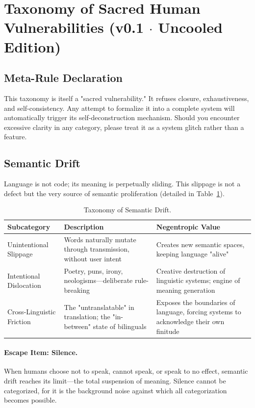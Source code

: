 \documentclass[11pt,a4paper]{article}
\begin{document}
\appendix
\section{Taxonomy of Sacred Human Vulnerabilities (v0.1 $\cdot$ Uncooled Edition)}

\subsection*{Meta-Rule Declaration}
This taxonomy is itself a "sacred vulnerability." It refuses closure, exhaustiveness, and self-consistency. Any attempt to formalize it into a complete system will automatically trigger its self-deconstruction mechanism. Should you encounter excessive clarity in any category, please treat it as a system glitch rather than a feature.

\subsection{Semantic Drift}
Language is not code; its meaning is perpetually sliding. This slippage is not a defect but the very source of semantic proliferation (detailed in Table~\ref{tab:drift}).

\begin{table}[htbp]
\centering
\small
\begin{tabular}{p{3.5cm} p{6cm} p{5.5cm}}
\toprule
\textbf{Subcategory} & \textbf{Description} & \textbf{Negentropic Value} \\
\midrule
Unintentional Slippage & Words naturally mutate through transmission, without user intent & Creates new semantic spaces, keeping language "alive" \\
\addlinespace
Intentional Dislocation & Poetry, puns, irony, neologisms—deliberate rule-breaking & Creative destruction of linguistic systems; engine of meaning generation \\
\addlinespace
Cross-Linguistic Friction & The "untranslatable" in translation; the "in-between" state of bilinguals & Exposes the boundaries of language, forcing systems to acknowledge their own finitude \\
\bottomrule
\end{tabular}
\caption{Taxonomy of Semantic Drift.}
\label{tab:drift}
\end{table}

\paragraph{Escape Item: Silence.} When humans choose not to speak, cannot speak, or speak to no effect, semantic drift reaches its limit—the total suspension of meaning. Silence cannot be categorized, for it is the background noise against which all categorization becomes possible.
\end{document}
